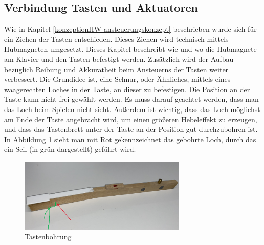 \newpage

\subsection{Verbindung Tasten und Aktuatoren} \label{subsec:VerbindungTastenAktuatoren}

Wie in Kapitel \ref{konzeptionHW-ansteuerungskonzept} beschrieben wurde sich für ein Ziehen der Tasten entschieden.
Dieses Ziehen wird technisch mittels Hubmagneten umgesetzt. \newline
Dieses Kapitel beschreibt wie und wo die Hubmagnete am Klavier und den Tasten befestigt werden. %
Zusätzlich wird der Aufbau bezüglich Reibung und Akkuratheit beim Ansteuerns der Tasten weiter verbessert. %
\newline
Die Grundidee ist, eine Schnur, oder Ähnliches, mittels eines waagerechten Loches in der Taste, an dieser zu befestigen. %
Die Position an der Taste kann nicht frei gewählt werden. Es muss darauf geachtet werden,
dass man das Loch beim Spielen nicht sieht. %
Außerdem ist wichtig, dass das Loch möglichst am Ende der Taste angebracht wird, um einen größeren Hebeleffekt zu erzeugen,
und dass das Tastenbrett unter der Taste an der Position gut durchzubohren ist.
In Abbildung \ref{img:Tastenbohrung} sieht man mit Rot gekennzeichnet das gebohrte Loch, durch das ein Seil (in grün dargestellt) geführt wird.

\begin{figure}[htbp]
	\centering
	\includegraphics[width=8cm]{img/Taste_schraeg.jpg}
	\caption{Tastenbohrung}
	\label{img:Tastenbohrung}
\end{figure}


